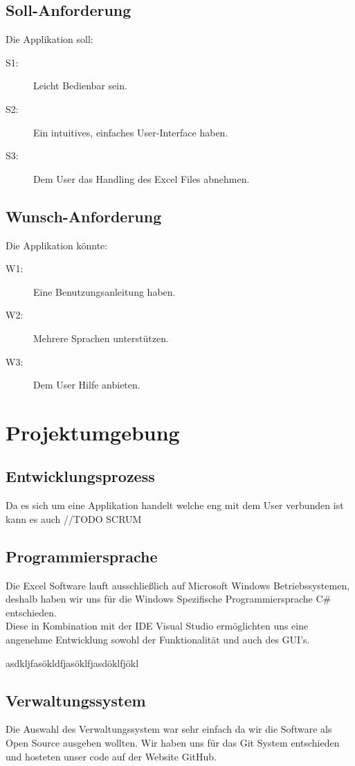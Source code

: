 \documentclass{article}
\begin{document}
\subsection{Soll-Anforderung}
Die Applikation soll:
\begin{description}
	\item[S1:] Leicht Bedienbar sein.
	\item[S2:] Ein intuitives, einfaches User-Interface haben.
	\item[S3:] Dem User das Handling des Excel Files abnehmen.
\end{description}

\subsection{Wunsch-Anforderung}
Die Applikation könnte:
\begin{description}
	\item[W1:] Eine Benutzungsanleitung haben.
	\item[W2:] Mehrere Sprachen unterstützen.
	\item[W3:] Dem User Hilfe anbieten.
\end{description}

\newpage

\section{Projektumgebung}
\vspace{5mm}
\subsection{Entwicklungsprozess	}
Da es sich um eine Applikation handelt welche eng mit dem User verbunden ist kann es auch //TODO SCRUM

\subsection{Programmiersprache}
Die Excel Software lauft ausschließlich auf Microsoft Windows Betriebssystemen, deshalb haben wir uns für die Windows Spezifische Programmiersprache C\# entschieden. \\ Diese in Kombination mit der IDE Visual Studio ermöglichten uns eine angenehme Entwicklung sowohl der Funktionalität und auch des GUI's.

asdkljfasökldfjasöklfjasdöklfjökl
 

\subsection{Verwaltungssystem}
Die Auswahl des Verwaltungssystem war sehr einfach da wir die Software als Open Source ausgeben wollten. Wir haben uns für das Git System entschieden und hosteten unser code auf der Website GitHub.
\end{document}
